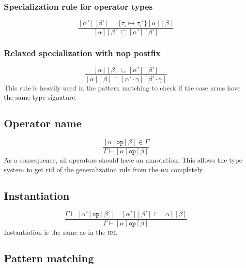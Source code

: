 \documentclass{article}
\newcommand{\op}[3]{[#1] \texttt{#2} [#3]}
\begin{document}
\subsubsection*{Specialization rule for operator types}

\begin{equation*}
  \tag{Spec}
  \frac{
    \op{\alpha'}{}{\beta'} = \{ \tau_i \mapsto \tau_i' \} \op{\alpha}{}{\beta}
  }{
    \op{\alpha}{}{\beta} \sqsubseteq \op{\alpha'}{}{\beta'}
  }
\end{equation*}

\subsubsection*{Relaxed specialization with nop postfix}

\begin{equation*}
  \tag{Nop postfix}
  \frac{
    \op{\alpha}{}{\beta} \sqsubseteq \op{\alpha'}{}{\beta'}
  }{
    \op{\alpha}{}{\beta} \sqsubseteq \op{\alpha' \cdot \gamma}{}{\beta' \cdot \gamma}
  }
\end{equation*}
This rule is heavily used in the pattern matching to check if the case
arms have the same type signature.

\subsection*{Operator name}

\begin{equation*}
  \tag{Op}
  \frac{
    \op{\alpha}{op}{\beta} \in \Gamma
  }{
    \Gamma \vdash
    \op{\alpha}{op}{\beta}
  }
\end{equation*}
As a consequence, all operators should have an annotation. This allows
the type system to get rid of the generalization rule from the \textsc{hm} completely

\subsection*{Instantiation}

\begin{equation*}
  \tag{Inst}
  \frac{
    \Gamma \vdash
    \op{\alpha'}{op}{\beta'} \quad \op{\alpha'}{}{\beta'} \sqsubseteq \op{\alpha}{}{\beta}
  }{
    \Gamma \vdash
    \op{\alpha}{op}{\beta}
  }
\end{equation*}
Instantiation is the same as in the \textsc{hm}.

\subsection*{Pattern matching}
\end{document}
